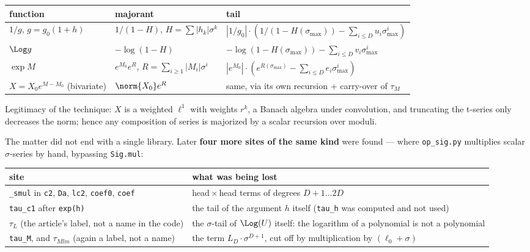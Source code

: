 \begin{center}
{\small\setlength{\tabcolsep}{4pt}
\begin{tabular}{|l|l|>{\raggedright\arraybackslash}p{}|}
\hline
function & majorant & tail \\
\hline
$1/g$, $g = g_0(1+h)$ & $1/(1-H)$, $H = \sum |h_k| \sigma^k$ & $|1/g_0| \cdot (1/(1-H(\sigma_{\max})) - \sum_{i \le D} u_i \sigma_{\max}^i)$ \\
\hline
$\Log g$ & $-\log(1-H)$ & $-\log(1-H(\sigma_{\max})) - \sum_{i \le D} v_i \sigma_{\max}^i$ \\
\hline
$\exp M$ & $e^{M_0} e^R$, $R = \sum_{i \ge 1} |M_i| \sigma^i$ & $|e^{M_0}| \cdot (e^{R(\sigma_{\max})} - \sum_{i \le D} e_i \sigma_{\max}^i)$ \\
\hline
$X = X_0 e^{M-M_0}$ (bivariate) & $\norm{X_0} e^R$ & same, via its own recursion + carry-over of $\tau_M$ \\
\hline
\end{tabular}}
\end{center}

Legitimacy of the technique: $X$ is a weighted $\ell^1$ with weights $r^k$, a
Banach algebra under convolution, and truncating the t-series only decreases
the norm; hence any composition of series is majorized by a scalar
recursion over moduli.

The matter did not end with a single library. Later \textbf{four more sites of
the same kind} were found --- where \texttt{op\_sig.py} multiplies scalar $\sigma$-series by
hand, bypassing \texttt{Sig.mul}:

\begin{center}
{\small\setlength{\tabcolsep}{4pt}
\begin{tabular}{|>{\raggedright\arraybackslash}p{}|>{\raggedright\arraybackslash}p{}|}
\hline
site & what was being lost \\
\hline
\texttt{\_smul} in \texttt{c2}, \texttt{Da}, \texttt{lc2}, \texttt{coef0}, \texttt{coef} & head\,$\times$\,head terms of degrees $D+1\dots 2D$ \\
\hline
\texttt{tau\_c1} after \texttt{exp(h)} & the tail of the argument $h$ itself (\texttt{tau\_h} was computed and not used) \\
\hline
$\tau_L$ (the article's label, not a name in the code) & the $\sigma$-tail of $\Log(U)$ itself: the logarithm of a polynomial is not a polynomial \\
\hline
\texttt{tau\_M}, and $\tau_{Mlm}$ (again a label, not a name) & the term $L_D \cdot \sigma^{D+1}$, cut off by multiplication by $(\ell_0+\sigma)$ \\
\hline
\end{tabular}}
\end{center}

